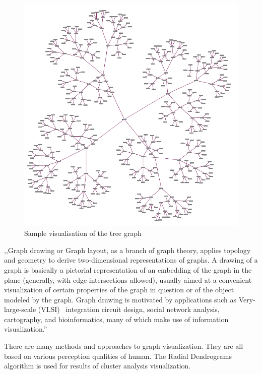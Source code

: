 \begin{figure}[h!]
\centering
\includegraphics[scale=0.3]{pictures/Tree_graph_example.png}
\caption{Sample visualisation of the tree graph}
\label{fig:tree_graph_example}
\end{figure}

,,Graph drawing or Graph layout, as a branch of graph theory, applies topology and geometry to derive two-dimensional representations of graphs.
A drawing of a graph is basically a pictorial representation of an embedding of the graph in the plane (generally, with edge intersections allowed),
usually aimed at a convenient visualization of certain properties of the graph in question or of the object modeled by the graph.
Graph drawing is motivated by applications such as Very-large-scale (VLSI)~\cite{VLSI} integration circuit design, social network analysis,
cartography, and bioinformatics, many of which make use of information visualization.''~\cite{Graph_drawing}

There are many methods and approaches to graph visualization. They are all based on various perception qualities of human.
The Radial Dendrograms~\cite{Radial_dendrogram} algorithm is used for results of cluster analysis visualization.

